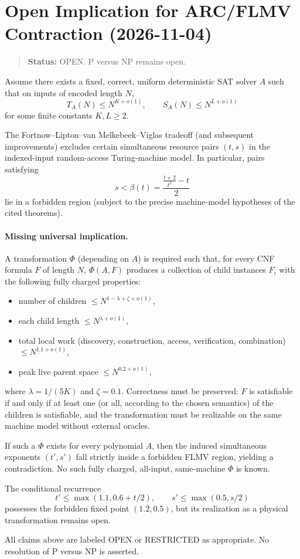 \documentclass{article}
\begin{document}
\section*{Open Implication for ARC/FLMV Contraction (2026-11-04)}

\begin{quote}
\textbf{Status:} OPEN. P versus NP remains open.
\end{quote}

Assume there exists a fixed, correct, uniform deterministic SAT solver \(A\) such that on inputs of encoded length \(N\),
\[
T_A(N) \le N^{K+o(1)}, \qquad S_A(N) \le N^{L+o(1)}
\]
for some finite constants \(K,L \ge 2\).

The Fortnow–Lipton–van Melkebeek–Viglas tradeoff (and subsequent improvements) excludes certain simultaneous resource pairs \((t,s)\) in the indexed-input random-access Turing-machine model. In particular, pairs satisfying
\[
s < \beta(t) = \frac{\frac{t+2}{t^2}-t}{2}
\]
lie in a forbidden region (subject to the precise machine-model hypotheses of the cited theorems).

\paragraph{Missing universal implication.}
A transformation \(\Phi\) (depending on \(A\)) is required such that, for every CNF formula \(F\) of length \(N\), \(\Phi(A,F)\) produces a collection of child instances \(F_i\) with the following fully charged properties:
\begin{itemize}
\item number of children \(\le N^{1-\lambda+\zeta+o(1)}\),
\item each child length \(\le N^{\lambda+o(1)}\),
\item total local work (discovery, construction, access, verification, combination) \(\le N^{1.1+o(1)}\),
\item peak live parent space \(\le N^{0.2+o(1)}\),
\end{itemize}
where \(\lambda = 1/(5K)\) and \(\zeta = 0.1\). Correctness must be preserved: \(F\) is satisfiable if and only if at least one (or all, according to the chosen semantics) of the children is satisfiable, and the transformation must be realizable on the same machine model without external oracles.

If such a \(\Phi\) exists for every polynomial \(A\), then the induced simultaneous exponents \((t',s')\) fall strictly inside a forbidden FLMV region, yielding a contradiction. No such fully charged, all-input, same-machine \(\Phi\) is known.

The conditional recurrence
\[
t' \le \max(1.1, 0.6 + t/2), \qquad s' \le \max(0.5, s/2)
\]
possesses the forbidden fixed point \((1.2, 0.5)\), but its realization as a physical transformation remains open.

All claims above are labeled OPEN or RESTRICTED as appropriate. No resolution of P versus NP is asserted.
\end{document}
